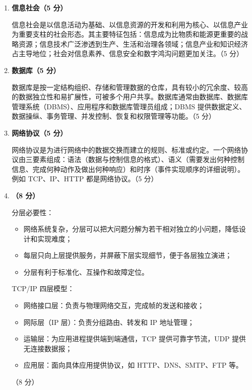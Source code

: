 \documentclass[a4paper,11pt]{article}
\begin{document}
\begin{enumerate}[start=29, label=\textbf{\arabic*.}, leftmargin=2.4em, itemsep=0.55em]

\item \textbf{信息社会（5 分）}

信息社会是以信息活动为基础、以信息资源的开发和利用为核心、以信息产业为重要支柱的社会形态。其主要特征包括：信息成为比物质和能源更重要的战略资源；信息技术广泛渗透到生产、生活和治理各领域；信息产业和知识经济占主导地位；社会对信息素养、信息安全和数字鸿沟问题更加关注。\hfill（5 分）

\item \textbf{数据库（5 分）}

数据库是按一定结构组织、存储和管理数据的仓库，具有较小的冗余度、较高的数据独立性和易扩展性，可被多个用户共享。数据库通常由数据库、数据库管理系统（DBMS）、应用程序和数据库管理员组成；DBMS 提供数据定义、数据操纵、事务管理、并发控制、恢复和权限管理等功能。\hfill（5 分）

\item \textbf{网络协议（5 分）}

网络协议是为进行网络中的数据交换而建立的规则、标准或约定。一个网络协议由三要素组成：语法（数据与控制信息的格式）、语义（需要发出何种控制信息、完成何种动作及做出何种响应）和时序（事件实现顺序的详细说明）。例如 TCP、IP、HTTP 都是网络协议。\hfill（5 分）

\item \textbf{（8 分）}

分层必要性：
\begin{itemize}[leftmargin=1.8em, itemsep=1pt]
  \item 网络系统复杂，分层可以把大问题分解为若干相对独立的小问题，降低设计和实现难度；
  \item 每层只向上层提供服务，并屏蔽下层实现细节，便于各层独立演进；
  \item 分层有利于标准化、互操作和故障定位。
\end{itemize}
TCP/IP 四层模型：
\begin{itemize}[leftmargin=1.8em, itemsep=1pt]
  \item 网络接口层：负责与物理网络交互，完成帧的发送和接收；
  \item 网际层（IP 层）：负责分组路由、转发和 IP 地址管理；
  \item 运输层：为应用进程提供端到端通信，TCP 提供可靠字节流，UDP 提供无连接数据报；
  \item 应用层：面向具体应用提供协议，如 HTTP、DNS、SMTP、FTP 等。
\end{itemize}
\hfill（8 分）


\end{enumerate}
\end{document}
